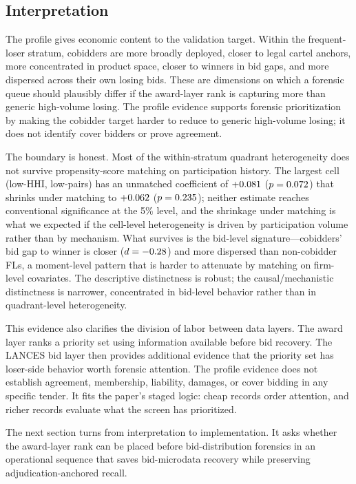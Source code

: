 \subsection{Interpretation}
\label{sec:cobidder_interpretation}

The profile gives economic content to the validation target.
Within the frequent-loser stratum, cobidders are more broadly
deployed, closer to legal cartel anchors, more concentrated in
product space, closer to winners in bid gaps, and more dispersed
across their own losing bids. These are dimensions on which a
forensic queue should plausibly differ if the award-layer rank is
capturing more than generic high-volume losing.
The profile evidence supports forensic prioritization by making
the cobidder target harder to reduce to generic high-volume
losing; it does not identify cover bidders or prove agreement.

The boundary is honest. Most of the within-stratum quadrant
heterogeneity does not survive propensity-score matching on
participation history. The largest cell (low-HHI, low-pairs)
has an unmatched coefficient of $+0.081$
($p=0.072$) that shrinks under matching to
$+0.062$ ($p=0.235$); neither
estimate reaches conventional significance at the 5\% level, and the
shrinkage under matching is what we expected if the cell-level
heterogeneity is driven by participation volume rather than by
mechanism. What
survives is the bid-level signature---cobidders' bid gap to
winner is closer ($d=-0.28$) and more dispersed than
non-cobidder FLs, a moment-level pattern that is harder to
attenuate by matching on firm-level covariates. The descriptive
distinctness is robust; the causal/mechanistic distinctness is
narrower, concentrated in bid-level behavior rather than in
quadrant-level heterogeneity.

This evidence also clarifies the division of labor between data
layers. The award layer ranks a priority set using
information available before bid recovery. The LANCES bid layer
then provides additional evidence that the priority set has
loser-side behavior worth forensic attention. The profile
evidence does not establish
agreement, membership, liability, damages, or cover bidding in
any specific tender. It fits the paper's staged logic: cheap
records order attention, and richer records evaluate what the
screen has prioritized.

The next section turns from interpretation to implementation. It
asks whether the award-layer rank can be placed before
bid-distribution forensics in an operational sequence that saves
bid-microdata recovery while preserving adjudication-anchored
recall.
